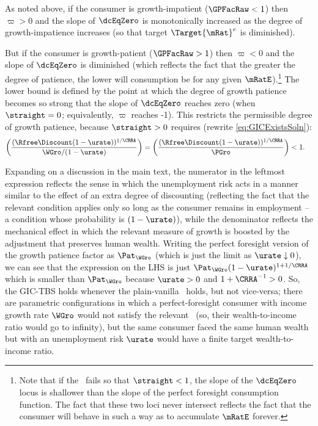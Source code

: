 \documentclass{\handout}
\begin{document}
As noted above, if the consumer is growth-impatient ($\GPFacRaw < 1$) then $\varpi > 0$ and the slope of $\dcEqZero$ is monotonically increased as the degree of growth-impatience increases (so that target $\Target{\mRat}^{e}$ is diminished).  

But if the consumer is growth-patient ($\GPFacRaw > 1$) then $\varpi < 0$ and the slope of $\dcEqZero$ is diminished (which reflects the fact that the greater the degree of patience, the lower will consumption be for any given $\mRatE$).\footnote{Note that if the \GICPGro~fails so that $\straight < 1$, the slope of the $\dcEqZero$ locus is shallower than the slope of the perfect foresight consumption function.  The fact that these two loci never intersect reflects the fact that the consumer will behave in such a way as to accumulate $\mRatE$ forever.}  The lower bound is defined by the point at which the degree of growth patience becomes so strong that the slope of $\dcEqZero$ reaches zero (when $\straight=0$; equivalently, $\varpi$ reaches -1).  This restricts the permissible degree of growth patience, because $\straight > 0$ requires (rewrite \eqref{eq:GICExistsSoln}):
\begin{equation}\begin{gathered}\begin{aligned}
  \left(\frac{(\Rfree \Discount (1-\urate))^{1/\CRRA}}{\WGro/(1-\urate)}\right) = \left(\frac{(\Rfree \Discount (1-\urate))^{1/\CRRA}}{\PGro}\right) & <  1
.\end{aligned}\end{gathered}\end{equation}

Expanding on a discussion in the main text, the numerator in the leftmost expression reflects the sense in which the unemployment risk acts in a manner similar to the effect of an extra degree of discounting (reflecting the fact that the relevant condition applies only so long as the consumer remains in employment -- a condition whose probability is $(1-\urate)$), while the denominator reflects the mechanical effect in which the relevant measure of growth is boosted by the adjustment that preserves human wealth.  Writing the perfect foresight version of the growth patience factor as $\Pat_{\WGro}$ (which is just the limit as $\urate \downarrow 0$), we can see that the expression on the LHS is just $\Pat_{\WGro}(1-\urate)^{1+1/\CRRA}$ which is smaller than $\Pat_{\WGro}$ because $\urate>0$ and $1+\CRRA^{-1} > 0$.  So, the GIC-TBS holds whenever the plain-vanilla \GICPGro~holds, but not vice-versa; there are parametric configurations in which a perfect-foresight consumer with income growth rate $\WGro$ would not satisfy the relevant \GICWGro~(so, their wealth-to-income ratio would go to infinity), but the same consumer faced the same human wealth but with an unemployment risk $\urate$ would have a finite target wealth-to-income ratio.  
\end{document}
